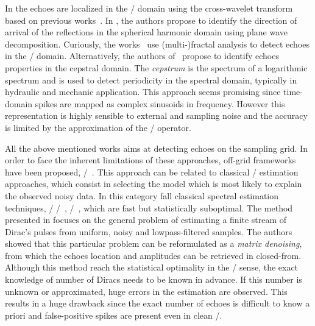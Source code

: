 In  the echoes are localized in the \TFdef/ domain using the cross-wavelet transform based on previous works~.
In , the authors propose to identify the direction of arrival of the reflections in the spherical harmonic domain using plane wave decomposition.
Curiously, the works~ use (multi-)fractal analysis to detect echoes in the \TFdef/ domain.
Alternatively, the authors of~ propose to identify echoes properties in the cepstral domain.
The \textit{cepstrum} is the spectrum of a logarithmic spectrum and is used to detect periodicity in the spectral domain, typically in hydraulic and mechanic application.
This approach seems promising since time-domain spikes are mapped as complex sinusoids in frequency.
However this representation is highly sensible to external and sampling noise and the accuracy is limited by the approximation of the \DFT/ operator.

\mynewline
All the above mentioned works aims at detecting echoes on the sampling grid.
In order to face the inherent limitations of these approaches, off-grid frameworks have been proposed, \eg/~.
This approach can be related to classical \MLdef/ estimation approaches, which consist in selecting the model which is most likely to explain the observed noisy data.
In this category fall classical spectral estimation techniques, \eg/ \MUSIC/~, \ESPRIT/~, which are fast but statistically suboptimal.
The method presented in  focuses on the general problem of estimating a finite stream of Dirac's pulses from uniform, noisy and lowpass-filtered samples.
The authors showed that this particular problem can be reformulated as a \textit{matrix denoising}, from which the echoes location and amplitudes can be retrieved in closed-from.
Although this method reach the statistical optimality in the \ML/ sense, the exact knowledge of number of Diracs needs to be known in advance.
If this number is unknown or approximated, huge errors in the estimation are observed.
This results in a huge drawback since the exact number of echoes is difficult to know a priori and false-positive spikes are present even in clean \RIRs/.

